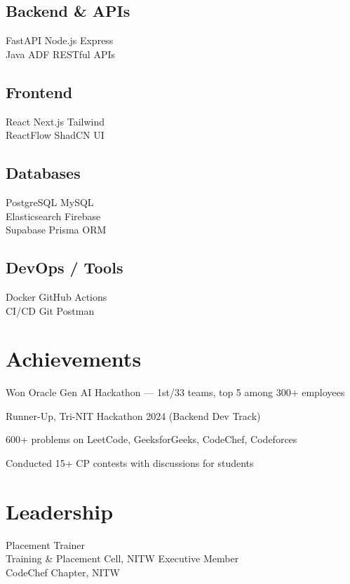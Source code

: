 \documentclass[]{deedy-resume-openfont}
\begin{document}
\begin{minipage}[t]{0.33\textwidth}
\subsection{Backend \& APIs}
FastAPI \textbullet{} Node.js \textbullet{} Express \\
Java ADF \textbullet{} RESTful APIs
\sectionsep

\subsection{Frontend}
React \textbullet{} Next.js \textbullet{} Tailwind \\
ReactFlow \textbullet{} ShadCN UI
\sectionsep

\subsection{Databases}
PostgreSQL \textbullet{} MySQL \\
Elasticsearch \textbullet{} Firebase \\
Supabase \textbullet{} Prisma ORM
\sectionsep

\subsection{DevOps / Tools}
Docker \textbullet{} GitHub Actions \\
CI/CD \textbullet{} Git \textbullet{} Postman


\section{Achievements}
\sectionsep
\begin{tightemize}
\item Won Oracle Gen AI Hackathon — 1st/33 teams, top 5 among 300+ employees
\item Runner-Up, Tri-NIT Hackathon 2024 (Backend Dev Track)
\item 600+ problems on LeetCode, GeeksforGeeks, CodeChef, Codeforces
\item Conducted 15+ CP contests with discussions for students
\end{tightemize}



\section{Leadership}
Placement Trainer \\
{\footnotesize Training \& Placement Cell, NITW}
\sectionsep
Executive Member \\
{\footnotesize CodeChef Chapter, NITW}

\end{minipage}
\end{document}
